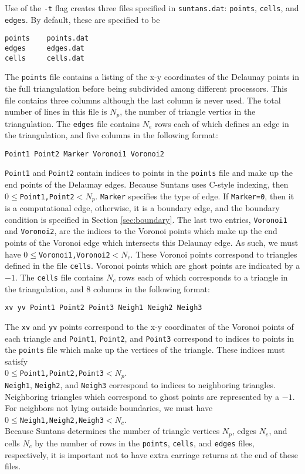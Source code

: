 \documentclass[12pt,oneside]{article}
\begin{document}
Use of the \verb+-t+ flag creates three files specified in \verb+suntans.dat+: 
\verb+points+, \verb+cells+, and \verb+edges+.  By default, these are specified
to be
\begin{verbatim}
points    points.dat
edges     edges.dat
cells     cells.dat
\end{verbatim}
The \verb+points+ file contains a listing of the x-y coordinates of the Delaunay points
in the full triangulation before being subdivided among different processors. 
This file contains three columns although the last column is never used.  The
total number of lines in this file is $N_p$, the number of triangle vertics in the triangulation.
The \verb+edges+ file contains $N_e$ rows each of which defines an
edge in the triangulation, and five columns in the following format:
\begin{verbatim}
Point1 Point2 Marker Voronoi1 Voronoi2
\end{verbatim}
\verb+Point1+ and \verb+Point2+ contain indices to points in the \verb+points+ file
and make up the end points of the Delaunay edges.  Because Suntans uses C-style
indexing, then $0\le$\verb+Point1,Point2+$<N_p$.  \verb+Marker+ specifies the type
of edge.  If \verb+Marker=0+, then it is a computational edge, otherwise, it is
a boundary edge, and the boundary condition is specified in Section \ref{sec:boundary}.
The last two entries, \verb+Voronoi1+ and \verb+Voronoi2+, are the indices to the Voronoi
points which make up the end points of the Voronoi edge which intersects this Delaunay edge.
As such, we must have $0\le$\verb+Voronoi1,Voronoi2+$<N_c$.
These Voronoi points correspond to triangles defined in the file \verb+cells+.  Voronoi points
which are ghost points are indicated by a $-1$.
The \verb+cells+ file contains $N_c$ rows each of which corresponds to a
triangle in the triangulation, and 8 columns in the following format:
\begin{verbatim}
xv yv Point1 Point2 Point3 Neigh1 Neigh2 Neigh3
\end{verbatim}
The \verb+xv+ and \verb+yv+ points correspond to the x-y coordinates
of the Voronoi points of each triangle and \verb+Point1+, \verb+Point2+, and \verb+Point3+
correspond to indices to points in the \verb+points+ file which make up the
vertices of the triangle.  These indices must satisfy \\
$0\le$\verb+Point1,Point2,Point3+$<N_p$. \\
\verb+Neigh1+, \verb+Neigh2+, and
\verb+Neigh3+ correspond to indices to neighboring triangles.  Neighboring
triangles which correspond to ghost points are represented by a $-1$.  For neighbors
not lying outside boundaries, we must have \\
$0\le$\verb+Neigh1,Neigh2,Neigh3+$<N_c$.\\
Because Suntans determines the number of triangle vertices $N_p$, edges $N_e$, and cells $N_c$
by the number of rows in the \verb+points+, \verb+cells+, and \verb+edges+ files, respectively,
it is important not to have extra carriage returns at the end of these files.
\end{document}

